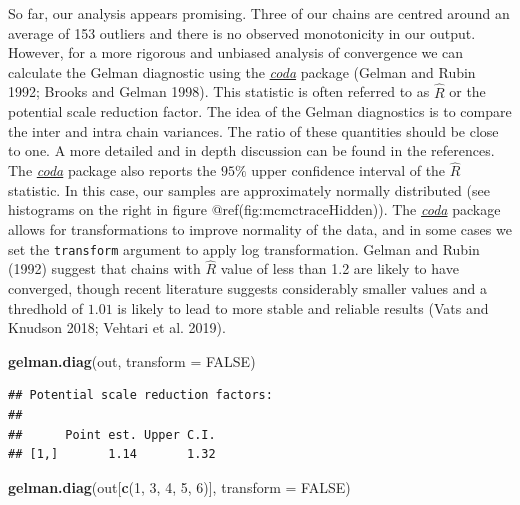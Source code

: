 \documentclass[
]{article}
\newenvironment{Shaded}{\begin{snugshade}}{\end{snugshade}}
\newcommand{\DataTypeTok}[1]{\textcolor[rgb]{0.13,0.29,0.53}{#1}}
\newcommand{\DecValTok}[1]{\textcolor[rgb]{0.00,0.00,0.81}{#1}}
\newcommand{\KeywordTok}[1]{\textcolor[rgb]{0.13,0.29,0.53}{\textbf{#1}}}
\newcommand{\NormalTok}[1]{#1}
\newcommand{\OtherTok}[1]{\textcolor[rgb]{0.56,0.35,0.01}{#1}}
\begin{document}
So far, our analysis appears promising. Three of our chains are centred
around an average of 153 outliers and there is no observed monotonicity
in our output. However, for a more rigorous and unbiased analysis of
convergence we can calculate the Gelman diagnostic using the
\emph{\href{https://CRAN.R-project.org/package=coda}{coda}} package
(Gelman and Rubin 1992; Brooks and Gelman 1998). This statistic is often
referred to as \(\hat{R}\) or the potential scale reduction factor. The
idea of the Gelman diagnostics is to compare the inter and intra chain
variances. The ratio of these quantities should be close to one. A more
detailed and in depth discussion can be found in the references. The
\emph{\href{https://CRAN.R-project.org/package=coda}{coda}} package also
reports the \(95\%\) upper confidence interval of the \(\hat{R}\)
statistic. In this case, our samples are approximately normally
distributed (see histograms on the right in figure
@ref(fig:mcmctraceHidden)). The
\emph{\href{https://CRAN.R-project.org/package=coda}{coda}} package
allows for transformations to improve normality of the data, and in some
cases we set the \texttt{transform} argument to apply log
transformation. Gelman and Rubin (1992) suggest that chains with
\(\hat{R}\) value of less than 1.2 are likely to have converged, though
recent literature suggests considerably smaller values and a thredhold
of \(1.01\) is likely to lead to more stable and reliable results (Vats
and Knudson 2018; Vehtari et al. 2019).

\begin{Shaded}
\begin{Highlighting}[]
\KeywordTok{gelman.diag}\NormalTok{(out, }\DataTypeTok{transform =} \OtherTok{FALSE}\NormalTok{)}
\end{Highlighting}
\end{Shaded}

\begin{verbatim}
## Potential scale reduction factors:
## 
##      Point est. Upper C.I.
## [1,]       1.14       1.32
\end{verbatim}

\begin{Shaded}
\begin{Highlighting}[]
\KeywordTok{gelman.diag}\NormalTok{(out[}\KeywordTok{c}\NormalTok{(}\DecValTok{1}\NormalTok{, }\DecValTok{3}\NormalTok{, }\DecValTok{4}\NormalTok{, }\DecValTok{5}\NormalTok{, }\DecValTok{6}\NormalTok{)], }\DataTypeTok{transform =} \OtherTok{FALSE}\NormalTok{)}
\end{Highlighting}
\end{Shaded}
\end{document}
